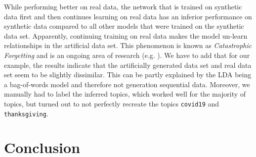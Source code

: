 \documentclass[11pt]{article}
\begin{document}
While performing better on real data, the network that is trained on synthetic data first and then continues learning on real data has an inferior performance on synthetic data compared to all other models that were trained on the synthetic data set. Apparently, continuing training on real data makes the model un-learn relationships in the artificial data set. This phenomenon is known as \emph{Catastrophic Forgetting} and is an ongoing area of research (e.g. \cite{kaushik2021understanding}). We have to add that for our example, the results indicate that the artificially generated data set and real data set seem to be slightly dissimilar. This can be partly explained by the LDA being a bag-of-words model and therefore not generation sequential data. Moreover, we manually had to label the inferred topics, which worked well for the majority of topics, but turned out to not perfectly recreate the topics \texttt{covid19} and \texttt{thanksgiving}.


\section{Conclusion}


\newpage
\printbibliography
\end{document}
